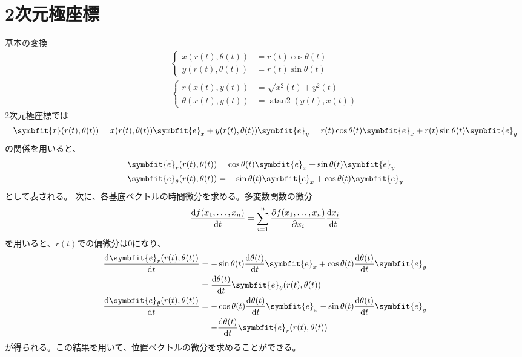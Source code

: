 \documentclass[12pt,oneside]{jlreq}
\DeclareMathOperator{\atantwo}{atan2}
\newcommand{\bm}[1]{\symbfit{#1}}
\begin{document}
\section{2次元極座標}
基本の変換
\begin{gather*}
    \left\{
        \begin{aligned}
            x(r(t),\theta(t))&=r(t)\cos\theta(t)\\
            y(r(t),\theta(t))&=r(t)\sin\theta(t)
        \end{aligned}
    \right.\\
    \left\{
        \begin{aligned}
            r(x(t),y(t))&=\sqrt{x^2(t)+y^2(t)}\\
            \theta(x(t),y(t))&=\atantwo\left(y(t),x(t)\right)
        \end{aligned}
    \right.
\end{gather*}
2次元極座標では
\[
\bm{r}(r(t),\theta(t))=x(r(t),\theta(t))\bm{e}_x+y(r(t),\theta(t))\bm{e}_{y}=r(t)\cos\theta(t)\bm{e}_x+r(t)\sin\theta(t)\bm{e}_y
\]
の関係を用いると、
\begin{align*}
    \bm{e}_{r}(r(t),\theta(t))&=\cos\theta(t)\bm{e}_x+\sin\theta(t)\bm{e}_y\\
    \bm{e}_{\theta}(r(t),\theta(t))&=-\sin\theta(t)\bm{e}_x+\cos\theta(t)\bm{e}_y
\end{align*}
として表される。
次に、各基底ベクトルの時間微分を求める。多変数関数の微分
\[
\odv{f(x_1,\dots,x_n)}{t}=\sum_{i=1}^{n}\pdv{f(x_1,\dots,x_n)}{x_i}\odv{x_i}{t}
\]
を用いると、\(r(t)\)での偏微分は0になり、
\begin{align*}
    \odv{\bm{e}_{r}(r(t),\theta(t))}{t}&=-\sin\theta(t)\odv{\theta(t)}{t}\bm{e}_x+\cos\theta(t)\odv{\theta(t)}{t}\bm{e}_y\\
    &=\odv{\theta(t)}{t}\bm{e}_{\theta}(r(t),\theta(t))\\
    \odv{\bm{e}_{\theta}(r(t),\theta(t))}{t}&=-\cos\theta(t)\odv{\theta(t)}{t}\bm{e}_x-\sin\theta(t)\odv{\theta(t)}{t}\bm{e}_y\\
    &=-\odv{\theta(t)}{t}\bm{e}_{r}(r(t),\theta(t))
\end{align*}
が得られる。この結果を用いて、位置ベクトルの微分を求めることができる。
\end{document}
